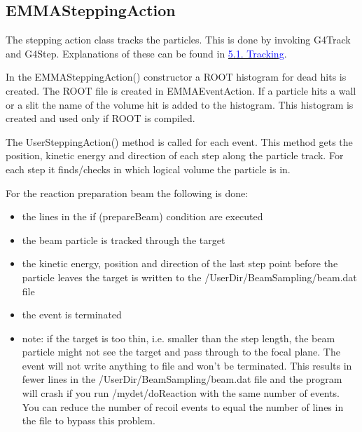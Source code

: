\documentclass{article}
\newcommand{\filefont}[1]{{\fontfamily{pnc}\selectfont #1}\xspace}
\newcommand{\hrefcolor}[2]{\href{#1}{\textcolor{blue}{#2}}\xspace}
\begin{document}
\subsection{EMMASteppingAction}

The stepping action class tracks the particles. This is done by invoking \filefont{G4Track} and \filefont{G4Step}. Explanations of these can be found in \hrefcolor{http://geant4.web.cern.ch/geant4/UserDocumentation/UsersGuides/ForApplicationDeveloper/html/ch05.html\#sect.Track}{5.1.  Tracking}.

In the \filefont{EMMASteppingAction()} constructor a ROOT histogram for dead hits is created. The ROOT file is created in \filefont{EMMAEventAction}. If a particle hits a wall or a slit the name of the volume hit is added to the histogram. This histogram is created and used only if ROOT is compiled.

The \filefont{UserSteppingAction()} method is called for each event. This method gets the position, kinetic energy and direction of each step along the particle track. For each step it finds/checks in which logical volume the particle is in.

For the reaction preparation beam the following is done:
\begin{itemize}
\item the lines in the \filefont{if (prepareBeam)} condition are executed
\item the beam particle is tracked through the target
\item the kinetic energy, position and direction of the last step point before the particle leaves the target is written to the \filefont{/UserDir/BeamSampling/beam.dat} file
\item the event is terminated
\item note: if the target is too thin, i.e. smaller than the step length, the beam particle might not see the target and pass through to the focal plane. The event will not write anything to file and won't be terminated. This results in fewer lines in the \filefont{/UserDir/BeamSampling/beam.dat} file and the program will crash if you run \filefont{/mydet/doReaction} with the same number of events. You can reduce the number of recoil events to equal the number of lines in the file to bypass this problem.
\end{itemize}
\end{document}
